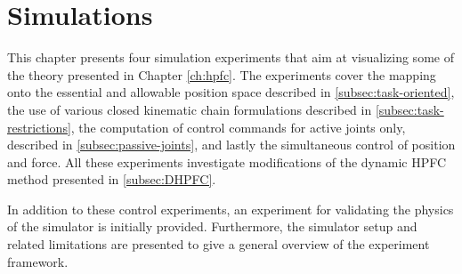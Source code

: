 \chapter{Simulations}\label{ch:results}

This chapter presents four simulation experiments that aim at visualizing some of the theory presented in Chapter \ref{ch:hpfc}. The experiments cover the mapping onto the essential and allowable position space described in \ref{subsec:task-oriented}, the use of various closed kinematic chain formulations described in \ref{subsec:task-restrictions}, the computation of control commands for active joints only, described in \ref{subsec:passive-joints}, and lastly the simultaneous control of position and force. All these experiments investigate modifications of the dynamic HPFC method presented in \ref{subsec:DHPFC}.

In addition to these control experiments, an experiment for validating the physics of the simulator is initially provided. Furthermore, the simulator setup and related limitations are presented to give a general overview of the experiment framework.











